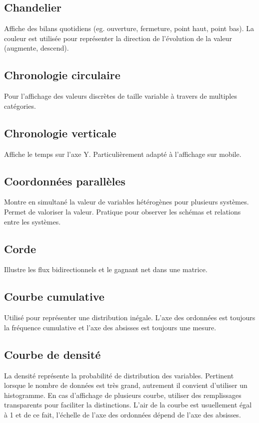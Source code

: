 \documentclass[a4paper,12pt]{article}
\begin{document}
\begin{multicols}{2}
\subsection*{Chandelier}
\label{sec:orge038dfb}
Affiche des bilans quotidiens (eg. ouverture, fermeture, point haut, point bas). \autocite{alansmithLexiqueVisuel}
La couleur est utilisée pour représenter la direction de l'évolution de la valeur (augmente, descend).
\subsection*{Chronologie circulaire}
\label{sec:org3aae8fe}
Pour l'affichage des valeurs discrètes de taille variable à travers de multiples catégories. \autocite{alansmithLexiqueVisuel}
\subsection*{Chronologie verticale}
\label{sec:orgde441b8}
Affiche le temps sur l'axe Y. Particulièrement adapté à l'affichage sur mobile. \autocite{alansmithLexiqueVisuel}
\subsection*{Coordonnées parallèles}
\label{sec:orgf307a83}
Montre en simultané la valeur de variables hétérogènes pour plusieurs systèmes. Permet de valoriser la valeur. \autocite{alansmithLexiqueVisuel}
Pratique pour observer les schémas et relations entre les systèmes. \autocite{mikeyiHowChooseRight2020}
\subsection*{Corde}
\label{sec:orgbbc8f16}
Illustre les flux bidirectionnels et le gagnant net dans une matrice. \autocite{alansmithLexiqueVisuel}
\subsection*{Courbe cumulative}
\label{sec:org9489748}
Utilisé pour représenter une distribution inégale. L'axe des ordonnées est toujours la fréquence cumulative et l'axe des absisses est toujours une mesure. \autocite{alansmithLexiqueVisuel}
\subsection*{Courbe de densité}
\label{sec:orgd4f0d59}
La densité représente la probabilité de distribution des variables. \autocite{sosulskiGraphics2019} Pertinent lorsque le nombre de données est très grand, autrement il convient d'utiliser un histogramme. \autocite{wilkeVisualizingManyDistributions2019} En cas d'affichage de plusieurs courbe, utiliser  des remplissages transparents pour faciliter la distinctions. L'air de la courbe est usuellement égal à 1 et de ce fait, l'échelle de l'axe des ordonnées dépend de l'axe des absisses. \autocite{wilkeVisualizingManyDistributions2019}

\end{multicols}
\end{document}
